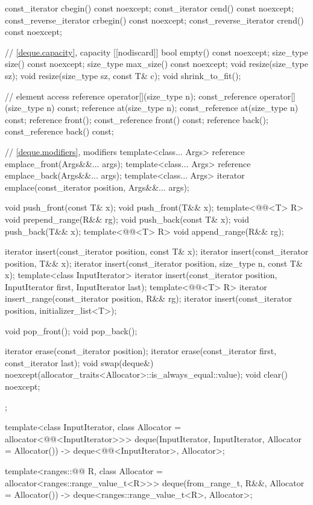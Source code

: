 \begin{codeblock}
{{    const_iterator         cbegin() const noexcept;
    const_iterator         cend() const noexcept;
    const_reverse_iterator crbegin() const noexcept;
    const_reverse_iterator crend() const noexcept;

    // \ref{deque.capacity}, capacity
    [[nodiscard]] bool empty() const noexcept;
    size_type size() const noexcept;
    size_type max_size() const noexcept;
    void      resize(size_type sz);
    void      resize(size_type sz, const T& c);
    void      shrink_to_fit();

    // element access
    reference       operator[](size_type n);
    const_reference operator[](size_type n) const;
    reference       at(size_type n);
    const_reference at(size_type n) const;
    reference       front();
    const_reference front() const;
    reference       back();
    const_reference back() const;

    // \ref{deque.modifiers}, modifiers
    template<class... Args> reference emplace_front(Args&&... args);
    template<class... Args> reference emplace_back(Args&&... args);
    template<class... Args> iterator emplace(const_iterator position, Args&&... args);

    void push_front(const T& x);
    void push_front(T&& x);
    template<@@<T> R>
      void prepend_range(R&& rg);
    void push_back(const T& x);
    void push_back(T&& x);
    template<@@<T> R>
      void append_range(R&& rg);

    iterator insert(const_iterator position, const T& x);
    iterator insert(const_iterator position, T&& x);
    iterator insert(const_iterator position, size_type n, const T& x);
    template<class InputIterator>
      iterator insert(const_iterator position, InputIterator first, InputIterator last);
    template<@@<T> R>
      iterator insert_range(const_iterator position, R&& rg);
    iterator insert(const_iterator position, initializer_list<T>);

    void pop_front();
    void pop_back();

    iterator erase(const_iterator position);
    iterator erase(const_iterator first, const_iterator last);
    void     swap(deque&)
      noexcept(allocator_traits<Allocator>::is_always_equal::value);
    void     clear() noexcept;
  };

  template<class InputIterator, class Allocator = allocator<@@<InputIterator>>>
    deque(InputIterator, InputIterator, Allocator = Allocator())
      -> deque<@@<InputIterator>, Allocator>;

  template<ranges::@@ R, class Allocator = allocator<ranges::range_value_t<R>>>
    deque(from_range_t, R&&, Allocator = Allocator())
      -> deque<ranges::range_value_t<R>, Allocator>;
}
\end{codeblock}


